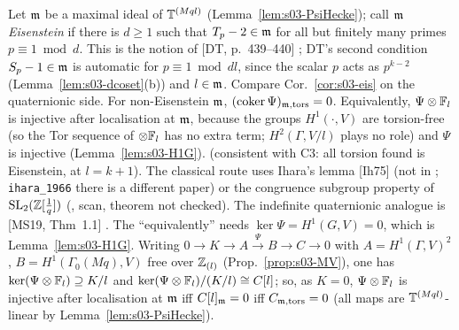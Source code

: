 \begin{conjecture}\label{conj:s03-iharaGL2}
Let $\mathfrak{m}$ be a maximal ideal of $\mathbb{T}^{(Mql)}$ (Lemma~\ref{lem:s03-PsiHecke}); call $\mathfrak{m}$ \emph{Eisenstein} if there is $d\ge1$ such that $T_p-2\in\mathfrak{m}$ for all but finitely
many primes $p\equiv1\bmod d$. This is the notion of [DT, p.~439--440]
; DT's second condition $S_p-1\in\mathfrak{m}$ is automatic for $p\equiv1\bmod dl$, since the
scalar $p$ acts as $p^{k-2}$ (Lemma~\ref{lem:s03-dcoset}(b)) and $l\in\mathfrak{m}$. Compare Cor.~\ref{cor:s03-eis} on the quaternionic side.
For non-Eisenstein $\mathfrak{m}$, $(\operatorname{coker}\Psi)_{\mathfrak{m},\mathrm{tors}}=0$. Equivalently, $\Psi\otimes\mathbb{F}_l$ is injective after localisation at
$\mathfrak{m}$, because the groups $H^1(\cdot,V)$ are torsion-free (so the Tor sequence of $\otimes\mathbb{F}_l$ has no extra term; $H^2(\Gamma,V/l)$ plays no role) and $\Psi$ is injective (Lemma~\ref{lem:s03-H1G}). \stexp{} (consistent with C3: all torsion found is
Eisenstein, at $l=k+1$). The classical route uses Ihara's lemma [Ih75] (not in ; \texttt{ihara\_1966} there is a different paper) or the congruence subgroup
property of $\mathrm{SL}_2(\mathbb{Z}[\frac1q])$ (, scan, theorem not checked). The indefinite quaternionic analogue
is [MS19, Thm~1.1]
 \stcited.
The ``equivalently'' needs $\ker\Psi=H^1(G,V)=0$, which is Lemma~\ref{lem:s03-H1G}. Writing $0\to K\to A\xrightarrow\Psi B\to C\to0$ with
$A=H^1(\Gamma,V)^2$, $B=H^1(\Gamma_0(Mq),V)$ free over $\mathbb{Z}_{(l)}$ (Prop.~\ref{prop:s03-MV}), one has $\ker(\Psi\otimes\mathbb{F}_l)\supseteq K/l$ and
$\ker(\Psi\otimes\mathbb{F}_l)/(K/l)\cong C[l]$; so, as $K=0$, $\Psi\otimes\mathbb{F}_l$ is injective after localisation at $\mathfrak{m}$ iff $C[l]_{\mathfrak{m}}=0$ iff $C_{\mathfrak{m},\mathrm{tors}}=0$
(all maps are $\mathbb{T}^{(Mql)}$-linear by Lemma~\ref{lem:s03-PsiHecke}).
\end{conjecture}

